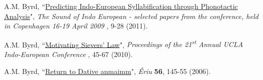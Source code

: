 \documentclass[paper=letter,fontsize=11pt,enabledeprecatedfontcommands]{scrartcl} %
\newcommand{\NewPart}[2]{\section*{\uppercase{#1} #2}}
\newcommand{\PaperEntry}[7]{
		\noindent #1, ``\href{#7}{#2}", \textit{#3} \textbf{#4}, #5 (#6).}
\begin{document}
\begin{etaremune}

\item \PaperEntry{A.M. Byrd}{Predicting Indo-European Syllabification through Phonotactic Analysis}{The Sound of Indo European - selected papers from the conference, held in Copenhagen 16-19 April 2009}{\hspace{-.35em}}{9-28}{2011}{http://rootsofeurope.ku.dk/english/activities/sound_of_indo-european/}

\item \PaperEntry{A.M. Byrd}{Motivating Sievers’ Law}{Proceedings of the 21\textsuperscript{st} Annual UCLA Indo-European Conference}{\hspace{-.35em}}{45-67}{2010}{https://www.academia.edu/1166462/Motivating_Sievers_Law} 

\item \PaperEntry{A.M. Byrd}{Return to Dative anmaimm}{Ériu}{56}{145-55}{2006}{https://bill.celt.dias.ie/vol4/displayObject.php?TreeID=3182} 


\end{etaremune}



\end{document}
